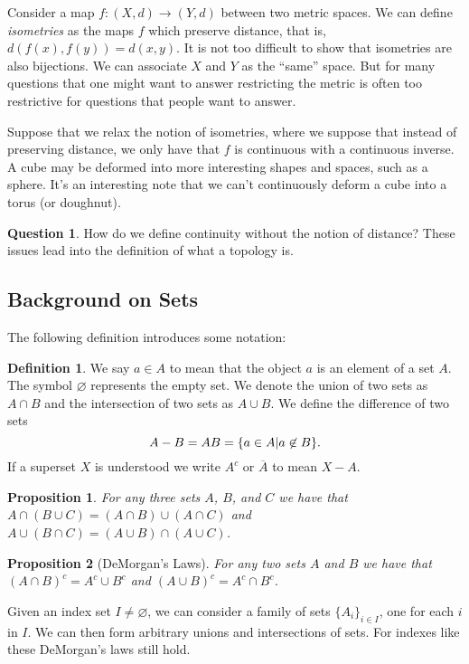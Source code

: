 \documentclass[12pt]{article}
\theoremstyle{plain}
\newtheorem{proposition}{Proposition}
\theoremstyle{definition}
\newtheorem{definition}{Definition}
\newtheorem{question}{Question}
\begin{document}
Consider a map $f:(X, d) \to (Y, d)$ between two metric spaces. We can define \textit{isometries} as the maps $f$ which preserve distance, that is, $d(f(x), f(y)) = d(x, y)$. It is not too difficult to show that isometries are also bijections. We can associate $X$ and $Y$ as the ``same'' space. But for many questions that one might want to answer restricting the metric is often too restrictive for questions that people want to answer.

Suppose that we relax the notion of isometries, where we suppose that instead of preserving distance, we only have that $f$ is continuous with a continuous inverse. A cube may be deformed into more interesting shapes and spaces, such as a sphere. It's an interesting note that we can't continuously deform a cube into a torus (or doughnut).

\begin{question}
How do we define continuity without the notion of distance? These issues lead into the definition of what a topology is.
\end{question}

\subsection{Background on Sets}

The following definition introduces some notation:
\begin{definition}
We say $a \in A$ to mean that the object $a$ is an element of a set $A$. The symbol $\varnothing$ represents the empty set. We denote the union of two sets as $A \cap B$ and the intersection of two sets as $A \cup B$. We define the difference of two sets 
\[A - B = A \\ B = \{a \in A | a \not\in B\}.\]
If a superset $X$ is understood we write $A^c$ or $\overline{A}$ to mean $X - A$.
\end{definition}

\begin{proposition}
For any three sets $A$, $B$, and $C$ we have that $A \cap (B \cup C) = (A \cap B) \cup (A \cap C)$ and $A \cup (B \cap C) = (A \cup B) \cap (A \cup C)$.
\end{proposition}

\begin{proposition}[DeMorgan's Laws]
For any two sets $A$ and $B$ we have that $(A \cap B)^c = A^c \cup B^c$ and $(A \cup B)^c = A^c \cap B^c$. 
\end{proposition}

Given an index set $I \neq \varnothing$, we can consider a family of sets $\{A_i\}_{i \in I}$, one for each $i$ in $I$. We can then form arbitrary unions and intersections of sets. For indexes like these DeMorgan's laws still hold.
\end{document}
